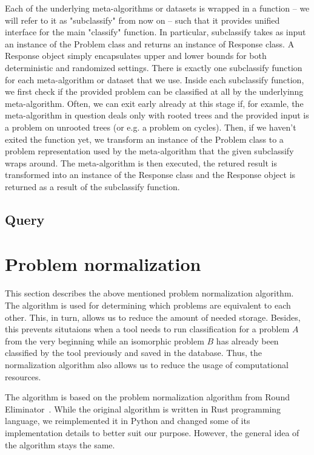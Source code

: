 Each of the underlying meta-algorithms or datasets is wrapped
in a function -- we will refer to it as "subclassify" from now on -- such
that it provides unified interface for the main
"classify" function. In particular, subclassify takes
as input an instance of the Problem class and
returns an instance of Response class. A Response object
simply encapsulates upper and lower bounds for both
deterministic and randomized settings. There is
exactly one subclassify function for each meta-algorithm
or dataset that we use. Inside each subclassify function,
we first check if the provided problem can be classified
at all by the underlyinng meta-algorithm. Often, we can
exit early already at this stage if, for examle, the meta-algorithm
in question deals only with rooted trees and the provided input is a 
problem on unrooted trees (or e.g. a problem on cycles). Then,
if we haven't exited the function yet,
we transform an instance of the Problem class to a problem
representation used by the meta-algorithm that the given
subclassify wraps around. The meta-algorithm is then executed,
the retured result is transformed into an instance of the
Response class and the Response object is returned as
a result of the subclassify function.


\subsection{Query}


\section{Problem normalization}
\label{section:problem-normalization}

This section describes the above mentioned problem normalization
algorithm. The algorithm is used for determining which problems
are equivalent to each other. This, in turn, allows us
to reduce the amount of needed storage. Besides, this prevents
situtaions when a tool needs to run classification for a problem $A$
from the very beginning while an isomorphic problem $B$ has already been classified
by the tool previously and saved in the database. Thus, the normalization
algorithm also allows us to reduce the usage of computational resources.

The algorithm is based on the problem normalization algorithm
from Round Eliminator~\cite{FIXME}. While the original
algorithm is written in Rust programming language, we
reimplemented it in Python and changed some of its
implementation details to better suit our purpose.
However, the general idea of the algorithm stays the same.

